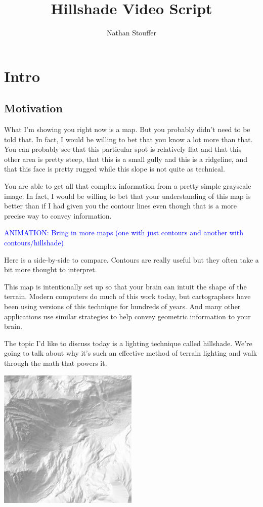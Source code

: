 \documentclass{article}
\newcommand\animation[1]{\textcolor{blue}{ANIMATION: #1}}
\begin{document}
	
\title{Hillshade Video Script}
\author{Nathan Stouffer}
\date{}
\maketitle

\section{Intro}

\subsection{Motivation}

What I'm showing you right now is a map.
But you probably didn't need to be told that.
In fact, I would be willing to bet that you know a lot more than that.
You can probably see that this particular spot is relatively flat and that this other area is pretty steep, that this is a small gully and this is a ridgeline, and that this face is pretty rugged while this slope is not quite as technical.

You are able to get all that complex information from a pretty simple grayscale image.
In fact, I would be willing to bet that your understanding of this map is better than if I had given you the contour lines even though that is a more precise way to convey information.

\animation{Bring in more maps (one with just contours and another with contours/hillshade)}

Here is a side-by-side to compare.
Contours are really useful but they often take a bit more thought to interpret.

This map is intentionally set up so that your brain can intuit the shape of the terrain.
Modern computers do much of this work today, but cartographers have been using versions of this technique for hundreds of years.
And many other applications use similar strategies to help convey geometric information to your brain.

The topic I'd like to discuss today is a lighting technique called hillshade.
We're going to talk about why it's such an effective method of terrain lighting and walk through the math that powers it.

\begin{center}
	\includegraphics[width=0.5\textwidth,frame]{assets/hillshade-example.png}
\end{center}
\end{document}
